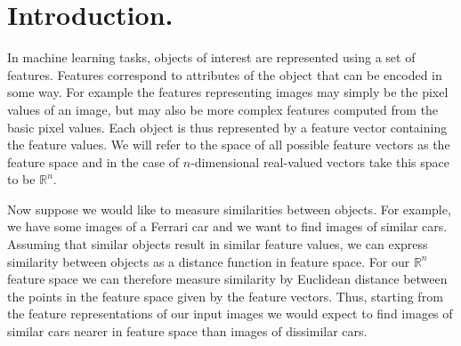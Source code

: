 









\section{Introduction.}

In machine learning tasks, objects of interest are represented using a set of features. Features correspond to attributes of the object that can be encoded in some way. For example the features representing images may simply be the pixel values of an image, but may also be more complex features computed from the basic pixel values. Each object is thus represented by a feature vector containing the feature values. We will refer to the space of all possible feature vectors as the feature space and in the case of $n$-dimensional real-valued vectors take this space to be $\mathbb{R}^n$.

Now suppose we would like to measure similarities between objects. For example, we have some images of a Ferrari car and we want to find images of similar cars. Assuming that similar objects result in similar feature values, we can express similarity between objects as a distance function in feature space. For our $\mathbb{R}^n$ feature space we can therefore measure similarity by Euclidean distance between the points in the feature space given by the feature vectors. Thus, starting from the feature representations of our input images we would expect to find images of similar cars nearer in feature space than images of dissimilar cars.

